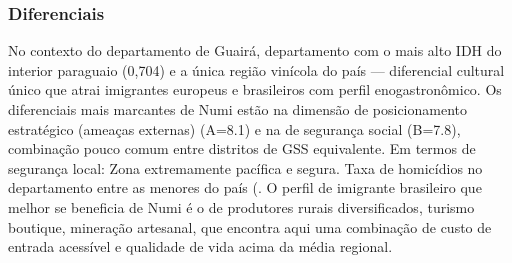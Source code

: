 \subsubsection*{Diferenciais}\label{dif-numi-0413}
No contexto do departamento de Guairá, departamento com o mais alto IDH do interior paraguaio (0,704) e a única região vinícola do país — diferencial cultural único que atrai imigrantes europeus e brasileiros com perfil enogastronômico. Os diferenciais mais marcantes de Numi estão na dimensão de posicionamento estratégico (ameaças externas) (A=8.1) e na de segurança social (B=7.8), combinação pouco comum entre distritos de GSS equivalente. Em termos de segurança local: Zona extremamente pacífica e segura. Taxa de homicídios no departamento entre as menores do país (. O perfil de imigrante brasileiro que melhor se beneficia de Numi é o de produtores rurais diversificados, turismo boutique, mineração artesanal, que encontra aqui uma combinação de custo de entrada acessível e qualidade de vida acima da média regional.
